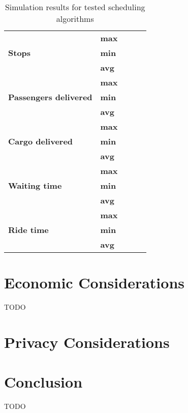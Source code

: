 \begin{table}[]
\begin{tabular}{llrrr}
\hline                                               
\multirow{3}{*}{\textbf{Stops}}                & \textbf{max} &                   &                    &                  \\
                                               & \textbf{min} &                   &                    &                  \\
                                               & \textbf{avg} &                   &                    &                  \\
\hline                                               
\multirow{3}{*}{\textbf{Passengers delivered}} & \textbf{max} &                   &                    &                  \\
                                               & \textbf{min} &                   &                    &                  \\
                                               & \textbf{avg} &                   &                    &                  \\
\hline                                               
\multirow{3}{*}{\textbf{Cargo delivered}}      & \textbf{max} &                   &                    &                  \\
                                               & \textbf{min} &                   &                    &                  \\
                                               & \textbf{avg} &                   &                    &                  \\
\hline                                               
\multirow{3}{*}{\textbf{Waiting time}}         & \textbf{max} &                   &                    &                  \\
                                               & \textbf{min} &                   &                    &                  \\
                                               & \textbf{avg} &                   &                    &                  \\
\hline
\multirow{3}{*}{\textbf{Ride time}}            & \textbf{max} &                   &                    &                  \\
                                               & \textbf{min} &                   &                    &                  \\
                                               & \textbf{avg} &                   &                    &                                 
\end{tabular}
\caption{\label{tab:impl:simulationresults} Simulation results for tested scheduling algorithms}
\end{table}

\section{Economic Considerations}
TODO

\section{Privacy Considerations}

\section{Conclusion}
TODO